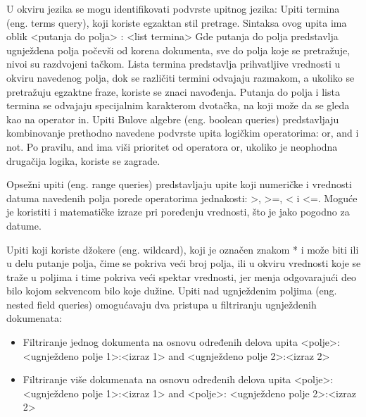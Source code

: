 \par
U okviru jezika se mogu identifikovati podvrste upitnog jezika:
Upiti termina (eng. terms query), koji koriste egzaktan stil pretrage. Sintaksa ovog upita ima oblik
<putanja do polja> : <list termina>
Gde putanja do polja predstavlja ugnježdena polja počevši od korena dokumenta, sve do polja koje se pretražuje, nivoi su razdvojeni tačkom. Lista termina predstavlja prihvatljive vrednosti u okviru navedenog polja, dok se različiti termini odvajaju razmakom, a ukoliko se pretražuju egzaktne fraze, koriste se znaci navođenja. Putanja do polja i lista termina se odvajaju specijalnim karakterom dvotačka, na koji može da se gleda kao na operator in.
Upiti Bulove algebre (eng. boolean queries) predstavljaju kombinovanje prethodno navedene podvrste upita logičkim operatorima: or, and i not. Po pravilu, and ima viši prioritet od operatora or, ukoliko je neophodna drugačija logika, koriste se zagrade.

\par
Opsežni upiti (eng. range queries) predstavljaju upite koji numeričke i vrednosti datuma navedenih polja porede operatorima jednakosti: >, >=, < i <=. Moguće je koristiti i matematičke izraze pri poređenju vrednosti, što je jako pogodno za datume.

\par
Upiti koji koriste džokere (eng. wildcard), koji je označen znakom * i može biti ili u delu putanje polja, čime se pokriva veći broj polja, ili u okviru vrednosti koje se traže u poljima i time pokriva veći spektar vrednosti, jer menja odgovarajući deo bilo kojom sekvencom bilo koje dužine.
Upiti nad ugnježdenim poljima (eng. nested field queries) omogućavaju dva pristupa u filtriranju ugnježdenih dokumenata:
\begin{itemize}
    \item Filtriranje jednog dokumenta na osnovu određenih delova upita
<polje>:{ <ugnježdeno polje 1>:<izraz 1> and <ugnježdeno polje 2>:<izraz 2> }
    \item Filtriranje više dokumenata na osnovu određenih delova upita
<polje>:{ <ugnježdeno polje 1>:<izraz 1> } and <polje>:{ <ugnježdeno polje 2>:<izraz 2> }
\end{itemize}